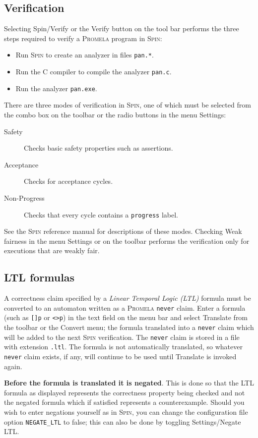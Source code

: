 \documentclass[11pt]{article}
\newcommand{\spn}{\textsc{Spin}}
\newcommand{\prm}{\textsc{Promela}}
\newcommand{\p}[1]{\texttt{#1}}
\newcommand{\bu}[1]{\textsf{#1}}
\begin{document}
\subsection{Verification}
Selecting \bu{Spin/Verify} or the \bu{Verify} button on the tool bar
performs the three steps required to verify a \prm{} program in \spn{}:
\begin{itemize}
\item Run \spn{} to create an analyzer in files \p{pan.*}.
\item Run the C compiler to compile the analyzer \p{pan.c}.
\item Run the analyzer \p{pan.exe}.
\end{itemize}
There are three modes of verification in \spn{},
one of which must be selected from the combo box on the toolbar
or the radio buttons in the menu \bu{Settings}:
\begin{description}
\item[Safety] Checks basic safety properties such as assertions.
\item[Acceptance] Checks for acceptance cycles.
\item[Non-Progress] Checks that every cycle contains a
\p{progress} label.
\end{description}
See the \spn{} reference manual for descriptions of these modes.
Checking \bu{Weak fairness} in the menu \bu{Settings}
or on the toolbar performs the verification only for executions that are
weakly fair.

\subsection{LTL formulas}\label{s.ltl}
A correctness claim specified by a \emph{Linear Temporal Logic (LTL)} formula
must be converted to an automaton written as a \prm{} \p{never} claim.
Enter a formula (such as \p{[]p} or \p{<>p}) in the text field on the menu
bar and select \bu{Translate} from the toolbar or the \bu{Convert} menu;
the formula translated into a \p{never}
claim which will be added to the next \spn{} verification.
The \p{never} claim is stored in a file with extension \p{.ltl}.
The formula is not automatically translated, so whatever \p{never}
claim exists, if any, will continue to be used until \bu{Translate} is invoked again.

\textbf{Before the formula is translated it is negated}. This is done so
that the LTL formula as displayed represents the correctness property
being checked and not the negated formula which if satisfied represents
a counterexample. Should you wish to enter negations yourself as in
\spn{}, you can change the configuration file option \p{NEGATE\_LTL} to
false; this can also be done by toggling \bu{Settings/Negate LTL}.
\end{document}
